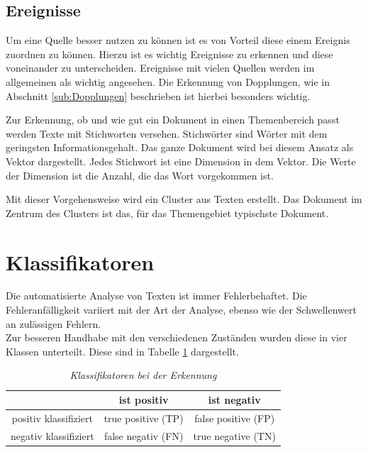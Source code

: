 \documentclass[twoside,a4paper]{article}
\begin{document}
\subsection{Ereignisse}
Um eine Quelle besser nutzen zu können ist es von Vorteil diese einem Ereignis zuordnen zu können. Hierzu ist es wichtig Ereignisse zu erkennen und diese voneinander zu unterscheiden. Ereignisse mit vielen Quellen werden im allgemeinen als wichtig angesehen. Die Erkennung von Dopplungen, wie in Abschnitt \ref{sub:Dopplungen} beschrieben ist hierbei besonders wichtig.\par

Zur Erkennung, ob und wie gut ein Dokument in einen Themenbereich passt werden Texte mit Stichworten versehen. Stichwörter sind Wörter mit dem geringsten Informationsgehalt. Das ganze Dokument wird bei diesem Ansatz als Vektor dargestellt. Jedes Stichwort ist eine Dimension in dem Vektor. Die Werte der Dimension ist die Anzahl, die das Wort vorgekommen ist.\par

Mit dieser Vorgehensweise wird ein Cluster aus Texten erstellt. Das Dokument im Zentrum des Clusters ist das, für das Themengebiet typischste Dokument.


\section{Klassifikatoren}
Die automatisierte Analyse von Texten ist immer Fehlerbehaftet. Die Fehleranfälligkeit variiert mit der Art der Analyse, ebenso wie der Schwellenwert an zulässigen Fehlern.\\
Zur besseren Handhabe mit den verschiedenen Zuständen wurden diese in vier Klassen unterteilt. Diese sind in Tabelle \ref{tab:Klassifikator} dargestellt.

\begin{table}[htdp]
  \caption{\it Klassifikatoren bei der Erkennung}
  \begin{center}
    \begin{tabular}{|c|c|c|}\hline
      					& ist positiv 	& ist negativ \\\hline
       positiv klassifiziert & true positive (TP) & false positive (FP)\\\hline
       negativ klassifiziert & false negativ (FN) & true negative (TN)\\	  
     \hline
    \end{tabular}
  \end{center}
  \label{tab:Klassifikator}
\end{table}
\end{document}

